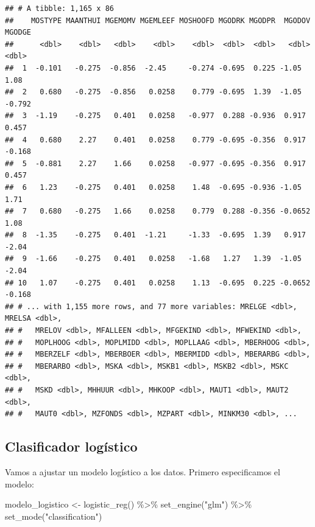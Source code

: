 \documentclass[
  12pt,
]{book}
\newenvironment{Shaded}{\begin{snugshade}}{\end{snugshade}}
\newcommand{\FunctionTok}[1]{\textcolor[rgb]{0.00,0.00,0.00}{#1}}
\newcommand{\NormalTok}[1]{#1}
\newcommand{\OtherTok}[1]{\textcolor[rgb]{0.56,0.35,0.01}{#1}}
\newcommand{\SpecialCharTok}[1]{\textcolor[rgb]{0.00,0.00,0.00}{#1}}
\newcommand{\StringTok}[1]{\textcolor[rgb]{0.31,0.60,0.02}{#1}}
\begin{document}
\begin{verbatim}
## # A tibble: 1,165 x 86
##    MOSTYPE MAANTHUI MGEMOMV MGEMLEEF MOSHOOFD MGODRK MGODPR  MGODOV MGODGE
##      <dbl>    <dbl>   <dbl>    <dbl>    <dbl>  <dbl>  <dbl>   <dbl>  <dbl>
##  1  -0.101   -0.275  -0.856  -2.45     -0.274 -0.695  0.225 -1.05    1.08 
##  2   0.680   -0.275  -0.856   0.0258    0.779 -0.695  1.39  -1.05   -0.792
##  3  -1.19    -0.275   0.401   0.0258   -0.977  0.288 -0.936  0.917   0.457
##  4   0.680    2.27    0.401   0.0258    0.779 -0.695 -0.356  0.917  -0.168
##  5  -0.881    2.27    1.66    0.0258   -0.977 -0.695 -0.356  0.917   0.457
##  6   1.23    -0.275   0.401   0.0258    1.48  -0.695 -0.936 -1.05    1.71 
##  7   0.680   -0.275   1.66    0.0258    0.779  0.288 -0.356 -0.0652  1.08 
##  8  -1.35    -0.275   0.401  -1.21     -1.33  -0.695  1.39   0.917  -2.04 
##  9  -1.66    -0.275   0.401   0.0258   -1.68   1.27   1.39  -1.05   -2.04 
## 10   1.07    -0.275   0.401   0.0258    1.13  -0.695  0.225 -0.0652 -0.168
## # ... with 1,155 more rows, and 77 more variables: MRELGE <dbl>, MRELSA <dbl>,
## #   MRELOV <dbl>, MFALLEEN <dbl>, MFGEKIND <dbl>, MFWEKIND <dbl>,
## #   MOPLHOOG <dbl>, MOPLMIDD <dbl>, MOPLLAAG <dbl>, MBERHOOG <dbl>,
## #   MBERZELF <dbl>, MBERBOER <dbl>, MBERMIDD <dbl>, MBERARBG <dbl>,
## #   MBERARBO <dbl>, MSKA <dbl>, MSKB1 <dbl>, MSKB2 <dbl>, MSKC <dbl>,
## #   MSKD <dbl>, MHHUUR <dbl>, MHKOOP <dbl>, MAUT1 <dbl>, MAUT2 <dbl>,
## #   MAUT0 <dbl>, MZFONDS <dbl>, MZPART <dbl>, MINKM30 <dbl>, ...
\end{verbatim}

\hypertarget{clasificador-loguxedstico}{%
\subsection{Clasificador logístico}\label{clasificador-loguxedstico}}

Vamos a ajustar un modelo logístico a los datos. Primero especificamos
el modelo:

\begin{Shaded}
\begin{Highlighting}[]
\NormalTok{modelo\_logistico }\OtherTok{\textless{}{-}} \FunctionTok{logistic\_reg}\NormalTok{() }\SpecialCharTok{\%\textgreater{}\%}
    \FunctionTok{set\_engine}\NormalTok{(}\StringTok{"glm"}\NormalTok{) }\SpecialCharTok{\%\textgreater{}\%}
    \FunctionTok{set\_mode}\NormalTok{(}\StringTok{"classification"}\NormalTok{)}
\end{Highlighting}
\end{Shaded}
\end{document}
